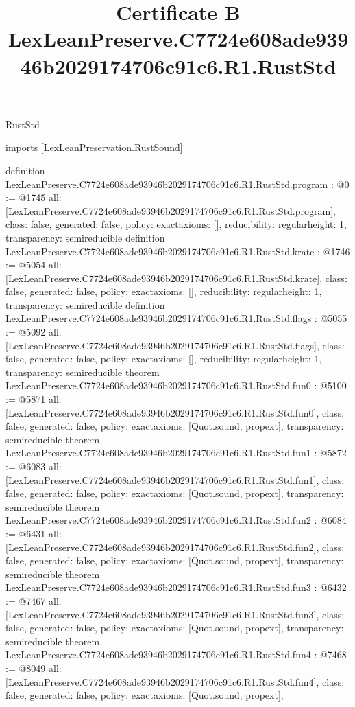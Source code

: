 \begin{lexlean}{RustStd}
\title{Certificate B LexLeanPreserve.C7724e608ade93946b2029174706c91c6.R1.RustStd}
\begin{coremodule}
imports [LexLeanPreservation.RustSound]

definition LexLeanPreserve.C7724e608ade93946b2029174706c91c6.R1.RustStd.program : @0 := @1745 {
  all: [LexLeanPreserve.C7724e608ade93946b2029174706c91c6.R1.RustStd.program],
  class: false,
  generated: false,
  policy: exact{axioms: []},
  reducibility: regular{height: 1},
  transparency: semireducible
}
definition LexLeanPreserve.C7724e608ade93946b2029174706c91c6.R1.RustStd.krate : @1746 := @5054 {
  all: [LexLeanPreserve.C7724e608ade93946b2029174706c91c6.R1.RustStd.krate],
  class: false,
  generated: false,
  policy: exact{axioms: []},
  reducibility: regular{height: 1},
  transparency: semireducible
}
definition LexLeanPreserve.C7724e608ade93946b2029174706c91c6.R1.RustStd.flags : @5055 := @5092 {
  all: [LexLeanPreserve.C7724e608ade93946b2029174706c91c6.R1.RustStd.flags],
  class: false,
  generated: false,
  policy: exact{axioms: []},
  reducibility: regular{height: 1},
  transparency: semireducible
}
theorem LexLeanPreserve.C7724e608ade93946b2029174706c91c6.R1.RustStd.fun0 : @5100 := @5871 {
  all: [LexLeanPreserve.C7724e608ade93946b2029174706c91c6.R1.RustStd.fun0],
  class: false,
  generated: false,
  policy: exact{axioms: [Quot.sound, propext]},
  transparency: semireducible
}
theorem LexLeanPreserve.C7724e608ade93946b2029174706c91c6.R1.RustStd.fun1 : @5872 := @6083 {
  all: [LexLeanPreserve.C7724e608ade93946b2029174706c91c6.R1.RustStd.fun1],
  class: false,
  generated: false,
  policy: exact{axioms: [Quot.sound, propext]},
  transparency: semireducible
}
theorem LexLeanPreserve.C7724e608ade93946b2029174706c91c6.R1.RustStd.fun2 : @6084 := @6431 {
  all: [LexLeanPreserve.C7724e608ade93946b2029174706c91c6.R1.RustStd.fun2],
  class: false,
  generated: false,
  policy: exact{axioms: [Quot.sound, propext]},
  transparency: semireducible
}
theorem LexLeanPreserve.C7724e608ade93946b2029174706c91c6.R1.RustStd.fun3 : @6432 := @7467 {
  all: [LexLeanPreserve.C7724e608ade93946b2029174706c91c6.R1.RustStd.fun3],
  class: false,
  generated: false,
  policy: exact{axioms: [Quot.sound, propext]},
  transparency: semireducible
}
theorem LexLeanPreserve.C7724e608ade93946b2029174706c91c6.R1.RustStd.fun4 : @7468 := @8049 {
  all: [LexLeanPreserve.C7724e608ade93946b2029174706c91c6.R1.RustStd.fun4],
  class: false,
  generated: false,
  policy: exact{axioms: [Quot.sound, propext]},
}
\end{coremodule}
\end{lexlean}

